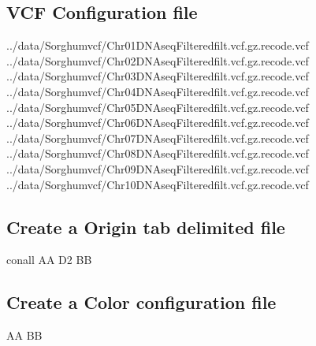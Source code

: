 \documentclass[letterpaper,10pt,english]{sphinxhowto}
\begin{document}
\subsection{VCF Configuration file}
\label{\detokenize{VCFHunter:vcf-configuration-file}}
\begin{sphinxVerbatim}[commandchars=\\\{\}]

../data/Sorghumvcf/Chr01\PYGZus{}DNAseq\PYGZus{}Filtered\PYGZus{}filt.vcf.gz.recode.vcf
../data/Sorghumvcf/Chr02\PYGZus{}DNAseq\PYGZus{}Filtered\PYGZus{}filt.vcf.gz.recode.vcf
../data/Sorghumvcf/Chr03\PYGZus{}DNAseq\PYGZus{}Filtered\PYGZus{}filt.vcf.gz.recode.vcf
../data/Sorghumvcf/Chr04\PYGZus{}DNAseq\PYGZus{}Filtered\PYGZus{}filt.vcf.gz.recode.vcf
../data/Sorghumvcf/Chr05\PYGZus{}DNAseq\PYGZus{}Filtered\PYGZus{}filt.vcf.gz.recode.vcf
../data/Sorghumvcf/Chr06\PYGZus{}DNAseq\PYGZus{}Filtered\PYGZus{}filt.vcf.gz.recode.vcf
../data/Sorghumvcf/Chr07\PYGZus{}DNAseq\PYGZus{}Filtered\PYGZus{}filt.vcf.gz.recode.vcf
../data/Sorghumvcf/Chr08\PYGZus{}DNAseq\PYGZus{}Filtered\PYGZus{}filt.vcf.gz.recode.vcf
../data/Sorghumvcf/Chr09\PYGZus{}DNAseq\PYGZus{}Filtered\PYGZus{}filt.vcf.gz.recode.vcf
../data/Sorghumvcf/Chr10\PYGZus{}DNAseq\PYGZus{}Filtered\PYGZus{}filt.vcf.gz.recode.vcf
\end{sphinxVerbatim}


\subsection{Create a Origin tab delimited file}
\label{\detokenize{VCFHunter:create-a-origin-tab-delimited-file}}
\begin{sphinxVerbatim}[commandchars=\\\{\}]

con\PYGZhy{}all AA
D2      BB
\end{sphinxVerbatim}


\subsection{Create a Color configuration file}
\label{\detokenize{VCFHunter:create-a-color-configuration-file}}
\begin{sphinxVerbatim}[commandchars=\\\{\}]

AA   
BB   
\end{sphinxVerbatim}
\end{document}

